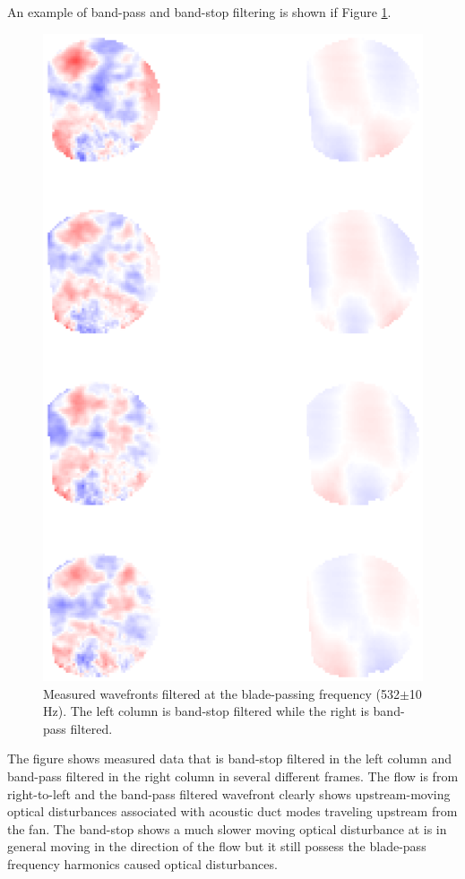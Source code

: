 An example of band-pass and band-stop filtering is shown if Figure \ref{fig:04_filter_temporal_bandpass}.
\begin{figure}
  \centering
  \includegraphics{../matlab/04_basic_filtering/filter_temporal_bandpass.eps}
  \caption{Measured wavefronts filtered at the blade-passing frequency (532$\pm$10 Hz).  The left column is band-stop filtered while the right is band-pass filtered.}
  \label{fig:04_filter_temporal_bandpass}
\end{figure}
The figure shows measured data that is band-stop filtered in the left column and band-pass filtered in the right column in several different frames.
The flow is from right-to-left and the band-pass filtered wavefront clearly shows upstream-moving optical disturbances associated with acoustic duct modes traveling upstream from the fan.
The band-stop shows a much slower moving optical disturbance at is in general moving in the direction of the flow but it still possess the blade-pass frequency harmonics caused optical disturbances.

